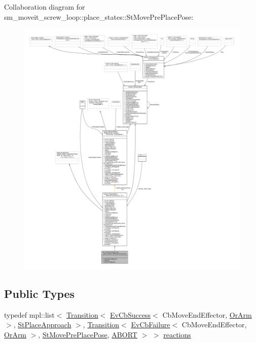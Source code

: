 Collaboration diagram for sm\+\_\+moveit\+\_\+screw\+\_\+loop\+:\+:place\+\_\+states\+:\+:St\+Move\+Pre\+Place\+Pose\+:
\nopagebreak
\begin{figure}[H]
\begin{center}
\leavevmode
\includegraphics[width=350pt]{structsm__moveit__screw__loop_1_1place__states_1_1StMovePrePlacePose__coll__graph}
\end{center}
\end{figure}
\subsection*{Public Types}
\begin{DoxyCompactItemize}
\item 
typedef mpl\+::list$<$ \hyperlink{classsmacc_1_1Transition}{Transition}$<$ \hyperlink{structsmacc_1_1EvCbSuccess}{Ev\+Cb\+Success}$<$ Cb\+Move\+End\+Effector, \hyperlink{classsm__moveit__screw__loop_1_1OrArm}{Or\+Arm} $>$, \hyperlink{structsm__moveit__screw__loop_1_1place__states_1_1StPlaceApproach}{St\+Place\+Approach} $>$, \hyperlink{classsmacc_1_1Transition}{Transition}$<$ \hyperlink{structsmacc_1_1EvCbFailure}{Ev\+Cb\+Failure}$<$ Cb\+Move\+End\+Effector, \hyperlink{classsm__moveit__screw__loop_1_1OrArm}{Or\+Arm} $>$, \hyperlink{structsm__moveit__screw__loop_1_1place__states_1_1StMovePrePlacePose}{St\+Move\+Pre\+Place\+Pose}, \hyperlink{structsmacc_1_1default__transition__tags_1_1ABORT}{A\+B\+O\+RT} $>$ $>$ \hyperlink{structsm__moveit__screw__loop_1_1place__states_1_1StMovePrePlacePose_aae470612de9c72a9c2e48e166fd874a9}{reactions}
\end{DoxyCompactItemize}
